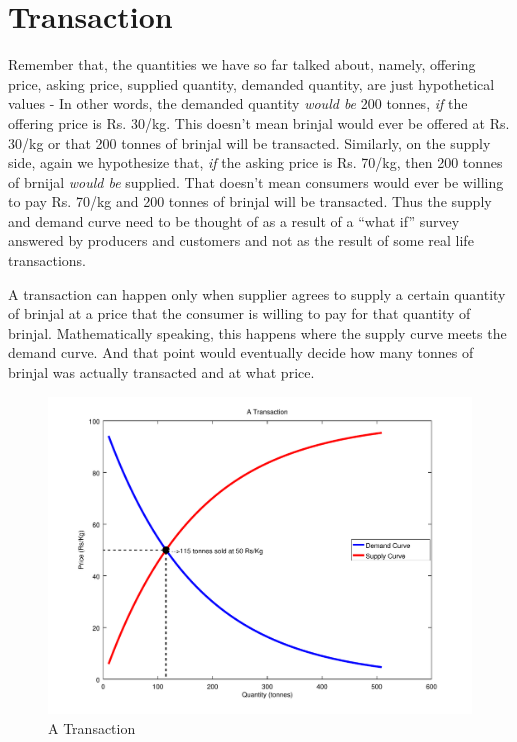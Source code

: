 \section{Transaction}
Remember that, the quantities we have so far talked about, namely, offering price, asking price, supplied quantity, demanded quantity, are just hypothetical values - In other words, the demanded quantity \emph{would be} 200 tonnes, \emph{if} the offering price is Rs. 30/kg. This doesn't mean brinjal would ever be offered at Rs. 30/kg or that 200 tonnes of brinjal will be transacted. Similarly, on the supply side, again we hypothesize that, \emph{if} the asking price is Rs. 70/kg, then 200 tonnes of brnijal \emph{would be} supplied. That doesn't mean consumers would ever be willing to pay Rs. 70/kg and 200 tonnes of brinjal will be transacted. Thus the supply and demand curve need to be thought of as a result of a ``what if'' survey answered by producers and customers  and not as the result of some real life transactions.

A transaction can happen only when supplier agrees to supply a certain quantity of brinjal at a price that the consumer is willing to pay for that quantity of brinjal. Mathematically speaking, this happens where the supply curve meets the demand curve. And that point would eventually decide how many tonnes of brinjal was actually transacted and at what price. 

	\begin{figure}[h]
		\centering
		\includegraphics[width = \textwidth]{supplyDemand/transaction}
		\caption{A Transaction}
		\label{fig:transactionPoint}
	\end{figure}
	
